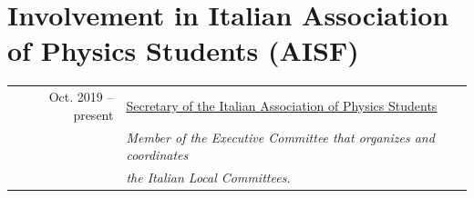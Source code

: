 \documentclass[a4, 11pt]{report}
\begin{document}
    \vskip 12mm
    
    \section*{Involvement in Italian Association of Physics Students (AISF)}
        \begin{tabular*}{\textwidth}{rl}%
            {\small Oct. 2019 -- present} & \ul{Secretary of the Italian Association of Physics Students}\\
            & {\small \emph {Member of the Executive Committee that organizes and coordinates}}\\
            & {\small \emph {the Italian Local Committees.}}\\ [3mm]
                                            
        
        
                                            
                                            
                                            

\end{tabular*}
\end{document}
